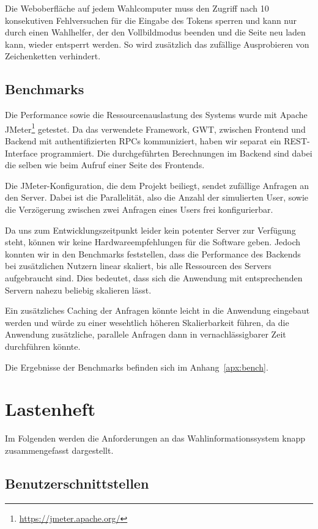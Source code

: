 \documentclass[a4paper]{scrreprt}
\begin{document}
Die Weboberfläche auf jedem Wahlcomputer muss den Zugriff nach 10 konsekutiven Fehlversuchen für die Eingabe des Tokens sperren und kann nur durch einen Wahlhelfer, der den Vollbildmodus beenden und die Seite neu laden kann, wieder entsperrt werden.
So wird zusätzlich das zufällige Ausprobieren von Zeichenketten verhindert.

\section{Benchmarks}

Die Performance sowie die Ressourcenauslastung des Systems wurde mit Apache JMeter\footnote{\url{https://jmeter.apache.org/}} getestet.
Da das verwendete Framework, GWT, zwischen Frontend und Backend mit authentifizierten RPCs kommuniziert, haben wir separat ein REST-Interface programmiert.
Die durchgeführten Berechnungen im Backend sind dabei die selben wie beim Aufruf einer Seite des Frontends.

Die JMeter-Konfiguration, die dem Projekt beiliegt, sendet zufällige Anfragen an den Server.
Dabei ist die Parallelität, also die Anzahl der simulierten User, sowie die Verzögerung zwischen zwei Anfragen eines Users frei konfigurierbar.

Da uns zum Entwicklungszeitpunkt leider kein potenter Server zur Verfügung steht, können wir keine Hardwareempfehlungen für die Software geben.
Jedoch konnten wir in den Benchmarks feststellen, dass die Performance des Backends bei zusätzlichen Nutzern linear skaliert, bis alle Ressourcen des Servers aufgebraucht sind.
Dies bedeutet, dass sich die Anwendung mit entsprechenden Servern nahezu beliebig skalieren lässt.

Ein zusätzliches Caching der Anfragen könnte leicht in die Anwendung eingebaut werden und würde zu einer wesehtlich höheren Skalierbarkeit führen, da die Anwendung zusätzliche, parallele Anfragen dann in vernachlässigbarer Zeit durchführen könnte.

Die Ergebnisse der Benchmarks befinden sich im Anhang~\ref{apx:bench}.


\chapter{Lastenheft}

Im Folgenden werden die Anforderungen an das Wahlinformationssystem knapp zusammengefasst dargestellt.

\section{Benutzerschnittstellen}
\end{document}
